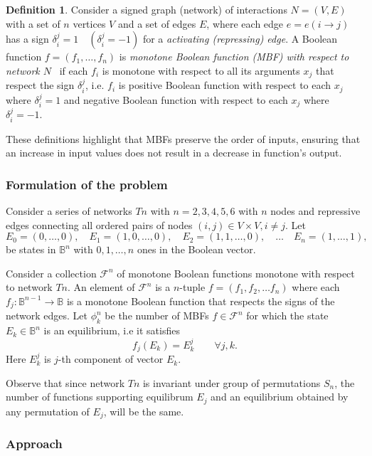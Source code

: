\documentclass[11pt,a4paper]{article}
\newcommand{\bbB}{\mathbb{B}}
\theoremstyle{definition}
\newtheorem{defn}{Definition}
\theoremstyle{remark}
\begin{document}
\begin{defn}
Consider  a signed graph (network) of interactions $N=(V,E)$ with a set of $n$ 
 vertices $V$ and a set of edges $E$, where each edge $e=e(i\to j)$ has a sign $\delta_i^j = 1 \quad (\delta_i^j = -1)$ for a \textit{activating (repressing) edge}. 
A  Boolean function $f=(f_1,\ldots, f_n)$ is \textit{monotone Boolean function (MBF) with respect to network $N$}~\parencite{gedeon_lattice_2024, gedeon_network_2024} if each $f_i$ is monotone with respect to all its arguments $x_j$ that respect the sign $\delta_i^j$, i.e. $f_i$ is positive Boolean function with respect to each $x_j$ where $\delta_i^j = 1$ and negative Boolean function with respect to each $x_j$ where $\delta_i^j = -1$. 
\end{defn}
These definitions highlight that MBFs preserve the order of inputs, ensuring that an increase in input values does not result in a decrease in function's output.

\subsubsection{Formulation of the problem}

Consider a series of networks $Tn$ with $n=2,3,4,5,6$  with $n$ nodes and repressive edges connecting  all ordered pairs of nodes $(i,j)\in V\times V, i\not = j$.
Let 
\[
E_0 = (0,\ldots,0), \quad E_1 = (1,0,\ldots, 0), \quad E_2 = (1,1,\ldots, 0),\quad  \ldots \quad E_n = (1,\ldots,1),
\]
be states in $\bbB^n$ with $0, 1, \ldots, n$ ones in the Boolean vector.

Consider a collection $\mathcal{ F}^n$ of monotone Boolean functions monotone with respect to network $Tn$. An element of $\mathcal{ F}^n$ is a $n$-tuple 
$f=(f_1, f_2, \ldots f_n)$ where each $f_j: \bbB^{n-1} \to \bbB$ is a monotone Boolean function that respects the signs of the network edges.
Let $\phi^n_k$ be the number of MBFs $f \in \mathcal{F}^n$ for which  the state 
$E_k \in \bbB^n$ is an equilibrium, i.e it satisfies 
\[ f_j(E_k) = E_k^j \qquad \forall  j, k.\]
Here $E_k^j$ is $j$-th component of vector $E_k$. 

Observe that since network $Tn$ is invariant under group of permutations  $S_n$,
the number of functions supporting equilibrum $E_j$ and an equilibrium obtained by any permutation of $E_j$, will be the same. 

\subsubsection{Approach }
\end{document}
